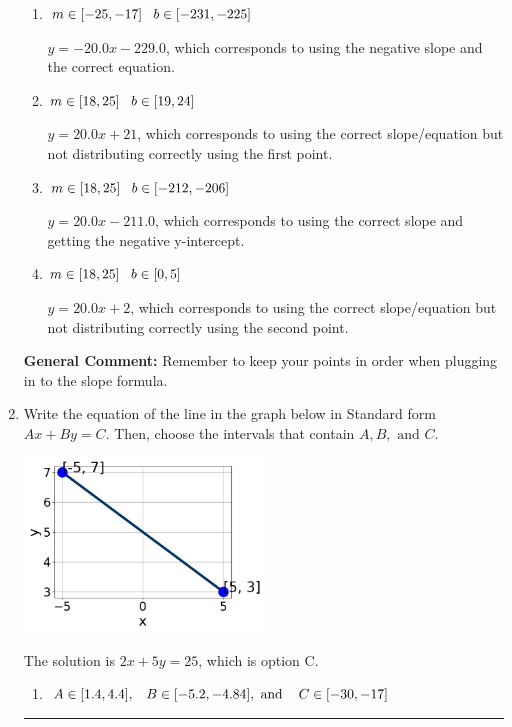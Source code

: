 \documentclass{extbook}[14pt]
\newcommand{\litem}[1]{\item #1

\rule{\textwidth}{0.4pt}}
\begin{document}
\begin{enumerate}
{\begin{enumerate}[label=\Alph*.]
* $y = 20.0x + 211.0$, which is the correct option.
\item \( m \in [-25, -17] \hspace*{3mm} b \in [-231, -225] \)

 $y = -20.0x -229.0$, which corresponds to using the negative slope and the correct equation.
\item \( m \in [18, 25] \hspace*{3mm} b \in [19, 24] \)

 $y = 20.0x + 21$, which corresponds to using the correct slope/equation but not distributing correctly using the first point.
\item \( m \in [18, 25] \hspace*{3mm} b \in [-212, -206] \)

 $y = 20.0x -211.0$, which corresponds to using the correct slope and getting the negative y-intercept.
\item \( m \in [18, 25] \hspace*{3mm} b \in [0, 5] \)

 $y = 20.0x + 2$, which corresponds to using the correct slope/equation but not distributing correctly using the second point.
\end{enumerate}

\textbf{General Comment:} Remember to keep your points in order when plugging in to the slope formula.
}
\litem{
Write the equation of the line in the graph below in Standard form $Ax+By=C$. Then, choose the intervals that contain $A, B, \text{ and } C$.

\begin{center}
    \includegraphics[width=0.5\textwidth]{../Figures/linearGraphToStandardCopyC.png}
\end{center}


The solution is \( 2x + 5y = 25 \), which is option C.\begin{enumerate}[label=\Alph*.]
\item \( A \in [1.4, 4.4], \hspace{3mm} B \in [-5.2, -4.84], \text{ and } \hspace{3mm} C \in [-30, -17] \)


\end{enumerate}}
\end{enumerate}
\end{document}
